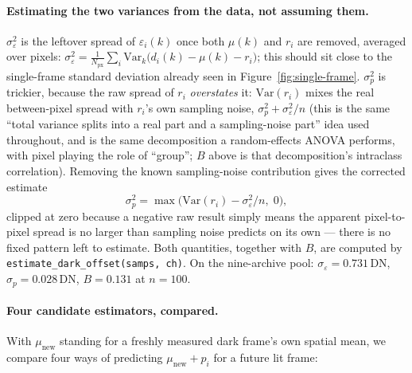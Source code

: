 \documentclass[11pt,a4paper]{article}
\newcommand{\code}[1]{\texttt{#1}}
\begin{document}
\paragraph{Estimating the two variances from the data, not assuming them.}
$\sigma_\varepsilon^2$ is the leftover spread of $\varepsilon_i(k)$ once
both $\mu(k)$ and $r_i$ are removed, averaged over pixels:
$\sigma_\varepsilon^2 = \frac{1}{N_{\mathrm{px}}}\sum_i
\mathrm{Var}_k\big(d_i(k) - \mu(k) - r_i\big)$; this should sit close to
the single-frame standard deviation already seen in
Figure~\ref{fig:single-frame}. $\sigma_p^2$ is trickier, because the raw
spread of $r_i$ \emph{overstates} it: $\mathrm{Var}(r_i)$ mixes the real
between-pixel spread with $r_i$'s own sampling noise, $\sigma_p^2 +
\sigma_\varepsilon^2/n$ (this is the same ``total variance splits into a
real part and a sampling-noise part'' idea used throughout, and is the same
decomposition a random-effects ANOVA performs, with pixel playing the role
of ``group''; $B$ above is that decomposition's intraclass correlation).
Removing the known sampling-noise contribution gives the corrected estimate
\[
\sigma_p^2 = \max\!\big(\mathrm{Var}(r_i) - \sigma_\varepsilon^2/n,\; 0\big),
\]
clipped at zero because a negative raw result simply means the apparent
pixel-to-pixel spread is no larger than sampling noise predicts on its own
--- there is no fixed pattern left to estimate. Both quantities, together
with $B$, are computed by \code{estimate\_dark\_offset(samps, ch)}. On the
nine-archive pool: $\sigma_\varepsilon = 0.731\,\mathrm{DN}$, $\sigma_p =
0.028\,\mathrm{DN}$, $B = 0.131$ at $n = 100$.

\paragraph{Four candidate estimators, compared.}
With $\mu_{\mathrm{new}}$ standing for a freshly measured dark frame's own
spatial mean, we compare four ways of predicting
$\mu_{\mathrm{new}} + p_i$ for a future lit frame:
\end{document}
